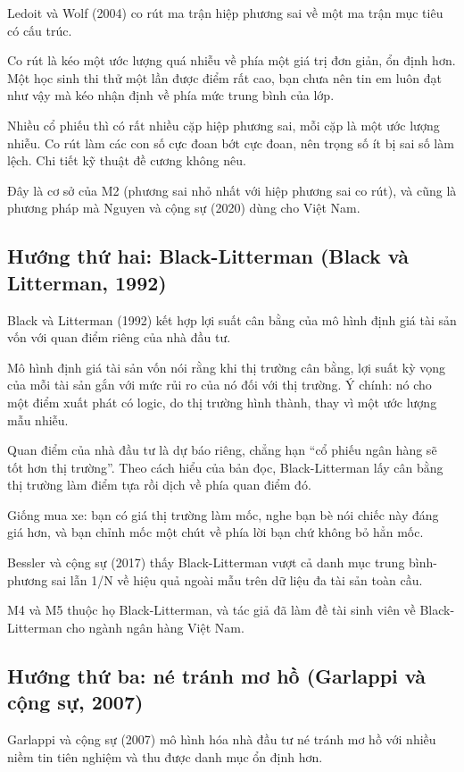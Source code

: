 Ledoit và Wolf (2004) co rút ma trận hiệp phương sai về một ma trận mục tiêu có cấu trúc.

Co rút là kéo một ước lượng quá nhiễu về phía một giá trị đơn giản, ổn định hơn. Một học sinh thi thử một lần được điểm rất cao, bạn chưa nên tin em luôn đạt như vậy mà kéo nhận định về phía mức trung bình của lớp.

Nhiều cổ phiếu thì có rất nhiều cặp hiệp phương sai, mỗi cặp là một ước lượng nhiễu. Co rút làm các con số cực đoan bớt cực đoan, nên trọng số ít bị sai số làm lệch. Chi tiết kỹ thuật đề cương không nêu.

Đây là cơ sở của M2 (phương sai nhỏ nhất với hiệp phương sai co rút), và cũng là phương pháp mà Nguyen và cộng sự (2020) dùng cho Việt Nam.

\subsection{Hướng thứ hai: Black-Litterman (Black và Litterman, 1992)}

Black và Litterman (1992) kết hợp lợi suất cân bằng của mô hình định giá tài sản vốn với quan điểm riêng của nhà đầu tư.

Mô hình định giá tài sản vốn nói rằng khi thị trường cân bằng, lợi suất kỳ vọng của mỗi tài sản gắn với mức rủi ro của nó đối với thị trường. Ý chính: nó cho một điểm xuất phát có logic, do thị trường hình thành, thay vì một ước lượng mẫu nhiễu.

Quan điểm của nhà đầu tư là dự báo riêng, chẳng hạn “cổ phiếu ngân hàng sẽ tốt hơn thị trường”. Theo cách hiểu của bản đọc, Black-Litterman lấy cân bằng thị trường làm điểm tựa rồi dịch về phía quan điểm đó.

Giống mua xe: bạn có giá thị trường làm mốc, nghe bạn bè nói chiếc này đáng giá hơn, và bạn chỉnh mốc một chút về phía lời bạn chứ không bỏ hẳn mốc.

Bessler và cộng sự (2017) thấy Black-Litterman vượt cả danh mục trung bình-phương sai lẫn 1/N về hiệu quả ngoài mẫu trên dữ liệu đa tài sản toàn cầu.

M4 và M5 thuộc họ Black-Litterman, và tác giả đã làm đề tài sinh viên về Black-Litterman cho ngành ngân hàng Việt Nam.

\subsection{Hướng thứ ba: né tránh mơ hồ (Garlappi và cộng sự, 2007)}

Garlappi và cộng sự (2007) mô hình hóa nhà đầu tư né tránh mơ hồ với nhiều niềm tin tiên nghiệm và thu được danh mục ổn định hơn.

